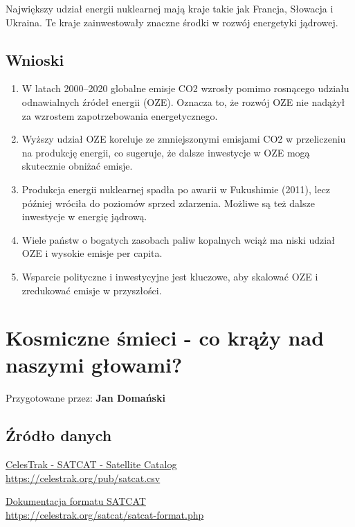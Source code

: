 \documentclass[12pt]{article}
\begin{document}
Największy udział energii nuklearnej mają kraje takie jak Francja, Słowacja i Ukraina. Te kraje zainwestowały znaczne środki w rozwój energetyki jądrowej.

\subsection{Wnioski}
\begin{enumerate}
    \item W latach 2000--2020 globalne emisje CO2 wzrosły pomimo rosnącego udziału odnawialnych źródeł energii (OZE). Oznacza to, że rozwój OZE nie nadążył za wzrostem zapotrzebowania energetycznego.
    \item Wyższy udział OZE koreluje ze zmniejszonymi emisjami CO2 w przeliczeniu na produkcję energii, co sugeruje, że dalsze inwestycje w OZE mogą skutecznie obniżać emisje.
    \item Produkcja energii nuklearnej spadła po awarii w Fukushimie (2011), lecz później wróciła do poziomów sprzed zdarzenia. Możliwe są też dalsze inwestycje w energię jądrową.
    \item Wiele państw o bogatych zasobach paliw kopalnych wciąż ma niski udział OZE i wysokie emisje per capita.
    \item Wsparcie polityczne i inwestycyjne jest kluczowe, aby skalować OZE i zredukować emisje w przyszłości.
\end{enumerate}






\newpage
\section{Kosmiczne śmieci - co krąży nad naszymi głowami?}

Przygotowane przez: \textbf{Jan Domański}

\subsection{Źródło danych}
\href{https://celestrak.org/pub/satcat.csv}{CelesTrak - SATCAT - Satellite Catalog}\\
\url{https://celestrak.org/pub/satcat.csv}

\href{https://celestrak.org/satcat/satcat-format.php}{Dokumentacja formatu SATCAT}\\
\url{https://celestrak.org/satcat/satcat-format.php}
\end{document}
